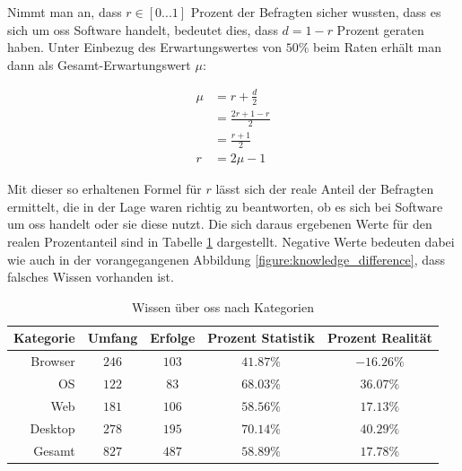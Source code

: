 \documentclass[a4paper]{article}
\begin{document}
                Nimmt man an, dass $r \in \left[0...1\right]$ Prozent der Befragten sicher wussten, dass es sich um \gls{oss} Software handelt, bedeutet dies, dass $d = 1 - r$ Prozent geraten haben. Unter Einbezug des Erwartungswertes von $50\%$ beim Raten erhält man dann als Gesamt-Erwartungswert $\mu$:
            
                \begin{equation}
                \begin{split}
                    \mu &= r + \frac{d}{2} \\
                        &= \frac{2r + 1 - r}{2} \\
                        &= \frac{r + 1}{2} \\
                    r   &= 2\mu - 1
                \end{split}
                \end{equation}
            
                Mit dieser so erhaltenen Formel für $r$ lässt sich der reale Anteil der Befragten ermittelt, die in der Lage waren richtig zu beantworten, ob es sich bei Software um \gls{oss} handelt oder sie diese nutzt. Die sich daraus ergebenen Werte für den realen Prozentanteil sind in Tabelle \ref{table:knowledge_by_category} dargestellt. Negative Werte bedeuten dabei wie auch in der vorangegangenen Abbildung \ref{figure:knowledge_difference}, dass falsches Wissen vorhanden ist.
                
                \begin{table}
                    \centering
                    \begin{tabular}{rcccc}
                        Kategorie & Umfang & Erfolge & Prozent Statistik & Prozent Realität \\\hline\hline
                        Browser & $246$ & $103$ & $41.87\%$ & $-16.26\%$\\
                        OS & $122$ & $83$ & $68.03\%$ & $36.07\%$\\
                        Web & $181$ & $106$ & $58.56\%$ & $17.13\%$\\
                        Desktop & $278$ & $195$ & $70.14\%$ & $40.29\%$\\\hline
                        Gesamt & $827$ & $487$ & $58.89\%$ & $17.78\%$
                    \end{tabular}
                    \caption{Wissen über \gls{oss} nach Kategorien}
                    \label{table:knowledge_by_category}
                \end{table}
                
\end{document}
